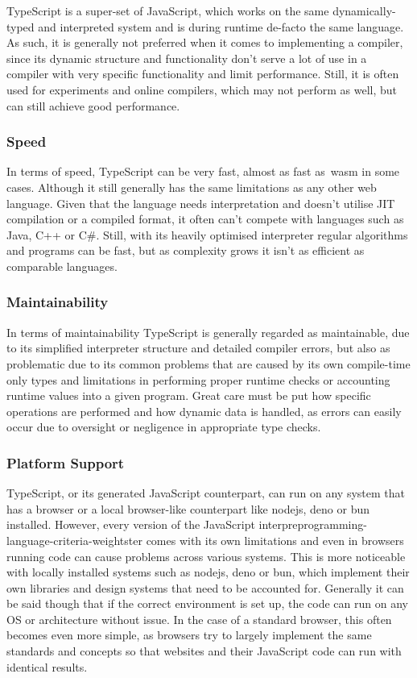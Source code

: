 TypeScript is a super-set of JavaScript, which works on the same dynamically-typed and interpreted system and is during runtime de-facto the same language. As such, it is generally not preferred when it comes to implementing a compiler, since its dynamic structure and functionality don't serve a lot of use in a compiler with very specific functionality and limit performance. Still, it is often used for experiments and online compilers, which may not perform as well, but can still achieve good performance.

\subsubsection{Speed}

In terms of speed, TypeScript can be very fast, almost as fast as~\acrshort{wasm} in some cases. Although it still generally has the same limitations as any other web language. Given that the language needs interpretation and doesn't utilise JIT compilation or a compiled format, it often can't compete with languages such as Java, C++ or C\#. Still, with its heavily optimised interpreter regular algorithms and programs can be fast, but as complexity grows it isn't as efficient as comparable languages.

\subsubsection{Maintainability}

In terms of maintainability TypeScript is generally regarded as maintainable, due to its simplified interpreter structure and detailed compiler errors, but also as problematic due to its common problems that are caused by its own compile-time only types and limitations in performing proper runtime checks or accounting runtime values into a given program. Great care must be put how specific operations are performed and how dynamic data is handled, as errors can easily occur due to oversight or negligence in appropriate type checks.

\subsubsection{Platform Support}

TypeScript, or its generated JavaScript counterpart, can run on any system that has a browser or a local browser-like counterpart like \Gls{nodejs}, \Gls{deno} or \Gls{bun} installed. However, every version of the JavaScript interpreprogramming-language-criteria-weightster comes with its own limitations and even in browsers running code can cause problems across various systems. This is more noticeable with locally installed systems such as \Gls{nodejs}, \Gls{deno} or \Gls{bun}, which implement their own libraries and design systems that need to be accounted for. Generally it can be said though that if the correct environment is set up, the code can run on any OS or architecture without issue. In the case of a standard browser, this often becomes even more simple, as browsers try to largely implement the same standards and concepts so that websites and their JavaScript code can run with identical results.

